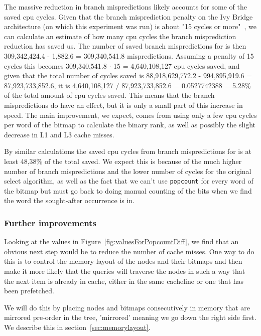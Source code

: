 The massive reduction in branch mispredictions likely accounts for some of the saved cpu cycles.
Given that the branch misprediction penalty on the Ivy Bridge architecture (on which this experiment was run) is about "15 cycles or more"~\cite{agner}, we can calculate an estimate of how many cpu cycles the branch misprediction reduction has saved us.
The number of saved branch mispredictions for  is then 309,342,424.4 - 1,882.6 = 309,340,541.8 mispredictions. Assuming a penalty of 15 cycles this becomes 309,340,541.8 $\cdot$ 15 = 4,640,108,127 cpu cycles saved, and given that the total number of cycles saved is 88,918,629,772.2 - 994,895,919.6 = 87,923,733,852.6, it is 4,640,108,127 / 87,923,733,852.6 = 0.0527742388 = 5.28\% of the total amount of cpu cycles saved.
This means that the branch mispredictions do have an effect, but it is only a small part of this increase in speed. The main improvement, we expect, comes from using only a few cpu cycles per word of the bitmap to calculate the binary rank, as well as possibly the slight decrease in L1 and L3 cache misses.


By similar calculations the saved cpu cycles from branch mispredictions for  is at least 48,38\% of the total saved. We expect this is because of the much higher number of branch mispredictions and the lower number of cycles for the original select algorithm, as well as the fact that we can't use \texttt{popcount} for every word of the bitmap but must go back to doing manual counting of the bits when we find the word the sought-after occurrence is in.


\subsubsection{Further improvements}
Looking at the values in Figure~\ref{fig:valuesForPopcountDiff}, we find that an obvious next step would be to reduce the number of cache misses. One way to do this is to control the memory layout of the nodes and their bitmaps and then make it more likely that the queries will traverse the nodes in such a way that the next item is already in cache, either in the same cacheline or one that has been prefetched.

We will do this by placing nodes and bitmaps consecutively in memory that are mirrored pre-order in the tree, 'mirrored' meaning we go down the right side first.
We describe this in section~\ref{sec:memorylayout}.

